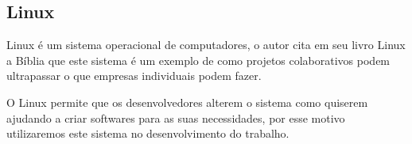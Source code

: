 \subsection{Linux}

Linux é um sistema operacional de computadores, o autor  cita em seu livro Linux a Bíblia que este sistema é um exemplo de como projetos colaborativos podem ultrapassar o que empresas individuais podem fazer.

O Linux permite que os desenvolvedores alterem o sistema como quiserem ajudando a criar softwares para as suas necessidades, por esse motivo utilizaremos este sistema no desenvolvimento do trabalho.
